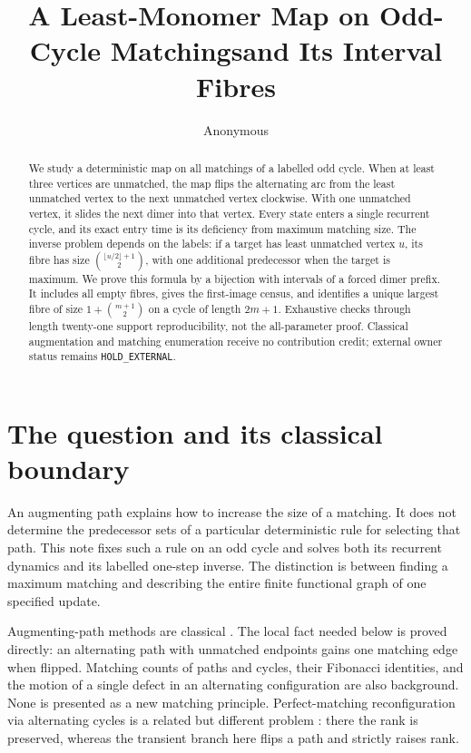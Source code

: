 \documentclass[a4paper,10pt]{amsart}
\title[Least-monomer matching dynamics]{A Least-Monomer Map on Odd-Cycle Matchings\newline and Its Interval Fibres}
\author{Anonymous}
\date{}
\theoremstyle{remark}
\begin{document}
\begin{abstract}
We study a deterministic map on all matchings of a labelled odd cycle.
When at least three vertices are unmatched, the map flips the alternating
arc from the least unmatched vertex to the next unmatched vertex clockwise.
With one unmatched vertex, it slides the next dimer into that vertex.
Every state enters a single recurrent cycle, and its exact entry time is
its deficiency from maximum matching size. The inverse problem depends on
the labels: if a target has least unmatched vertex $u$, its fibre has size
$\binom{\lfloor u/2\rfloor+1}{2}$, with one additional predecessor when the
target is maximum. We prove this formula by a bijection with intervals of a
forced dimer prefix. It includes all empty fibres, gives the first-image
census, and identifies a unique largest fibre of size
$1+\binom{m+1}{2}$ on a cycle of length $2m+1$. Exhaustive checks through
length twenty-one support reproducibility, not the all-parameter proof.
Classical augmentation and matching enumeration receive no contribution
credit; external owner status remains \texttt{HOLD\_EXTERNAL}.
\end{abstract}
\maketitle

\section{The question and its classical boundary}
An augmenting path explains how to increase the size of a matching.
It does not determine the predecessor sets of a particular deterministic
rule for selecting that path. This note fixes such a rule on an odd cycle
and solves both its recurrent dynamics and its labelled one-step inverse.
The distinction is between finding a maximum matching and describing the
entire finite functional graph of one specified update.

Augmenting-path methods are classical \cite{Berge1957}. The local fact
needed below is proved directly: an alternating path with unmatched
endpoints gains one matching edge when flipped. Matching counts of paths
and cycles, their Fibonacci identities, and the motion of a single defect
in an alternating configuration are also background. None is presented
as a new matching principle. Perfect-matching reconfiguration via
alternating cycles is a related but different problem
\cite{ItoEtAl2022}: there the rank is preserved, whereas the transient
branch here flips a path and strictly raises rank.
\end{document}
